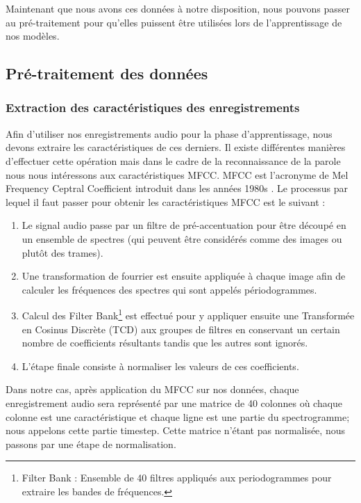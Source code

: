Maintenant que nous avons ces données à notre disposition, nous pouvons passer au pré-traitement pour qu'elles puissent être utilisées lors de l'apprentissage de nos modèles.

\subsection{Pré-traitement des données}
\subsubsection{Extraction des caractéristiques des enregistrements}\label{mfcc_section}
Afin d'utiliser nos enregistrements audio pour la phase d'apprentissage, nous devons extraire les caractéristiques de ces derniers. Il existe différentes manières d'effectuer cette opération mais dans le cadre de la reconnaissance de la parole nous nous intéressons aux caractéristiques MFCC. MFCC est l'acronyme de Mel Frequency Ceptral Coefficient introduit dans les années 1980s \cite{mfccintro}. Le processus par lequel il faut passer pour obtenir les caractéristiques MFCC est le suivant :
\begin{enumerate}[label=(\roman*)]
    \item Le signal audio passe par un filtre de pré-accentuation pour être découpé en un ensemble de spectres (qui peuvent être considérés comme des images ou plutôt des trames).
    \item Une transformation de fourrier est ensuite appliquée à chaque image afin de calculer les fréquences des spectres qui sont appelés périodogrammes.
    \item Calcul des Filter Bank\footnote{Filter Bank : Ensemble de 40 filtres appliqués aux periodogrammes pour extraire les bandes de fréquences.} est effectué pour y appliquer ensuite une Transformée en Cosinus Discrète (TCD) aux groupes de filtres en conservant un certain nombre de coefficients résultants tandis que les autres sont ignorés.
    \item L'étape finale consiste à normaliser les valeurs de ces coefficients.\\
\end{enumerate}

Dans notre cas, après application du MFCC sur nos données, chaque enregistrement audio sera représenté par une matrice de 40 colonnes où chaque colonne est une caractéristique et chaque ligne est une partie du spectrogramme; nous appelons cette partie timestep. Cette matrice n'étant pas normalisée, nous passons par une étape de normalisation.

